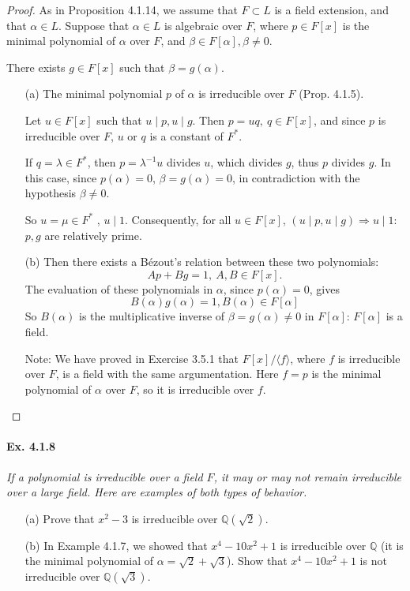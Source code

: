 \documentclass[11pt,a4paper]{article}
\newcommand{\Q}{\mathbb{Q}}
\begin{document}
\begin{proof}
As in Proposition 4.1.14, we assume that $F\subset L$ is a field extension, and that $\alpha \in L$. Suppose that $\alpha\in L$ is algebraic over $F$, where $p \in F[x]$ is the minimal polynomial of $\alpha$ over $F$,  and $\beta \in F[\alpha],\beta \neq 0$.

There exists $g \in F[x]$ such that $\beta = g(\alpha)$.

\begin{enumerate}
\item[(a)] The minimal polynomial $p$ of $\alpha$ is irreducible over $F$ (Prop. 4.1.5).

Let $u\in F[x]$ such that $u \mid p, u \mid g$. Then
$p = uq,\ q\in F[x]$, and since $p$ is irreducible over $F$,  $u$ or $q$ is a constant of $F^*$.

If $q =\lambda \in F^*$, then $p = \lambda^{-1} u $ divides $u$, which divides $g$, thus $p$ divides $g$. In this case, since $p(\alpha) = 0$, $\beta = g(\alpha) = 0$, in contradiction with the hypothesis $\beta \neq 0$.

So $u = \mu \in F^*$ , $u \mid 1$. Consequently, for all $u \in F[x]$, $(u \mid p, u \mid g) \Rightarrow u\mid 1$: $p,g$ are relatively prime.

\item[(b)]  Then there exists a B\'ezout's relation between these two polynomials:
$$Ap + Bg = 1, \ A,B \in F[x].$$
The evaluation of these polynomials in $\alpha$, since $p(\alpha)=0$, gives
$$B(\alpha) g(\alpha) = 1, B(\alpha) \in F[\alpha]$$
So $B(\alpha)$ is the multiplicative inverse of $\beta = g(\alpha)\neq 0$ in $F[\alpha]$: $F[\alpha]$ is a field.

Note: We have proved in Exercise 3.5.1 that $F[x]/\langle f\rangle$, where $f$ is irreducible over $F$,  is a field with the same argumentation. Here $f = p$ is the minimal polynomial  of $\alpha$ over $F$, so it is irreducible over $f$.
\end{enumerate}
\end{proof}

\paragraph{Ex. 4.1.8}

{\it If a polynomial is irreducible over a field $F$, it may or may not remain irreducible over a large field. Here are examples of both types of behavior.
\begin{enumerate}
\item[(a)] Prove that $x^2-3$ is irreducible over $\Q(\sqrt{2})$.
\item[(b)] In Example 4.1.7, we showed that $x^4 -10x^2+1$ is irreducible over $\Q$ (it is the minimal polynomial of $\alpha = \sqrt{2}+\sqrt{3}$). Show that $x^4-10x^2+1$ is not irreducible over $\Q(\sqrt{3})$.
\end{enumerate}
}
\end{document}
